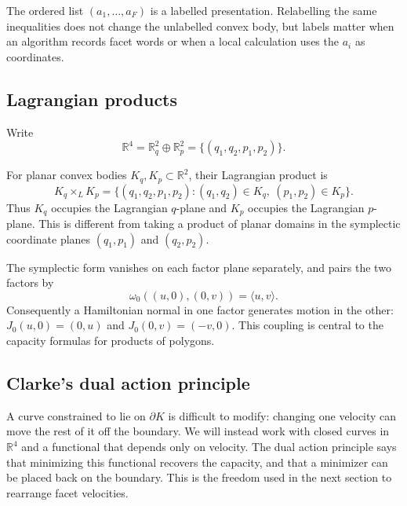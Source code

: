 The ordered list \((a_1,\ldots,a_F)\) is a labelled presentation.  Relabelling
the same inequalities does not change the unlabelled convex body, but labels
matter when an algorithm records facet words or when a local calculation uses
the \(a_i\) as coordinates.

\subsection{Lagrangian products}
\label{subsec:preliminaries-lagrangian-products}

Write
\[
  \mathbb R^4=\mathbb R_q^2\oplus\mathbb R_p^2
  =\{(q_1,q_2,p_1,p_2)\}.
\]
\begin{definition}
\label{def:preliminaries-lagrangian-product}
For planar convex bodies \(K_q,K_p\subset\mathbb R^2\), their Lagrangian
product is
\begin{equation}\label{eq:preliminaries-lagrangian-product}
  K_q\times_L K_p
  =\{(q_1,q_2,p_1,p_2):(q_1,q_2)\in K_q,\ (p_1,p_2)\in K_p\}.
\end{equation}
Thus \(K_q\) occupies the Lagrangian \(q\)-plane and \(K_p\) occupies the
Lagrangian \(p\)-plane.  This is different from taking a product of planar
domains in the symplectic coordinate planes \((q_1,p_1)\) and \((q_2,p_2)\).
\end{definition}

The symplectic form vanishes on each factor plane separately, and pairs
the two factors by
\[
 \omega_0((u,0),(0,v))=\langle u,v\rangle.
\]
Consequently a Hamiltonian normal in one factor generates motion in the
other: $J_0(u,0)=(0,u)$ and $J_0(0,v)=(-v,0)$. This coupling is central
to the capacity formulas for products of polygons.

\subsection{Clarke's dual action principle}
\label{subsec:preliminaries-clarke-dual-action-principle}

A curve constrained to lie on $\partial K$ is difficult to modify: changing
one velocity can move the rest of it off the boundary. We will instead work
with closed curves in $\mathbb R^4$ and a functional that depends only on
velocity. The dual action principle says that minimizing this functional
recovers the capacity, and that a minimizer can be placed back on the
boundary. This is the freedom used in the next section to rearrange facet
velocities.

